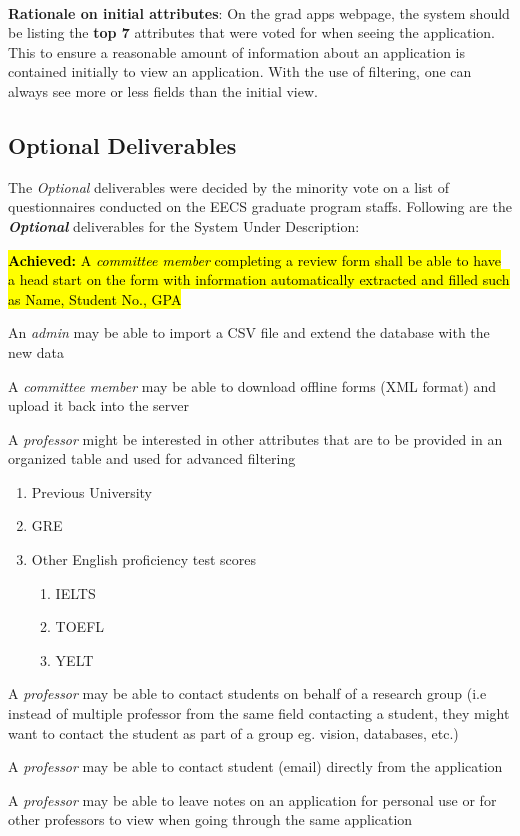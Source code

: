 \documentclass[fontsize=12pt,paper=letter,twoside]{scrartcl}
\begin{document}
\noindent \textbf{\\Rationale on initial attributes}: On the grad apps webpage, the system should be listing the \textbf{top 7} attributes that were voted for when seeing the application. This to ensure a reasonable amount of information about an application is contained initially to view an application. With the use of filtering, one can always see more or less fields than the initial view.

\newpage
\subsection{Optional Deliverables} \label{opt_delvs}

The \emph{Optional} deliverables were decided by the minority vote on a list of questionnaires conducted on the EECS graduate program staffs. Following are the \textbf{\emph{Optional}} deliverables for the System Under Description:\\

\begin{mylist}
\item \hl{\textbf{Achieved:} A \emph{committee member} completing a review form shall be able to have a head start on the form with information automatically extracted and filled such as Name, Student No., GPA}
\item An \emph{admin} may be able to import a CSV file and extend the database with the new data
\item A \emph{committee member} may be able to download offline forms (XML format) and upload it back into the server
\item A \emph{professor} might be interested in other attributes that are to be provided in an organized table and used for advanced filtering
\begin{enumerate}
\item Previous University
\item GRE
\item Other English proficiency test scores
\begin{enumerate}
\item IELTS
\item TOEFL
\item YELT
\end{enumerate}
\end{enumerate}
\item A \emph{professor} may be able to contact students on behalf of a research group (i.e instead of multiple professor from the same field contacting a student, they might want to contact the student as part of a group eg. vision, databases, etc.)
\item A \emph{professor} may be able to contact student (email) directly from the application
\item A \emph{professor} may be able to leave notes on an application for personal use or for other professors to view when going through the same application
\end{mylist}
\end{document}
